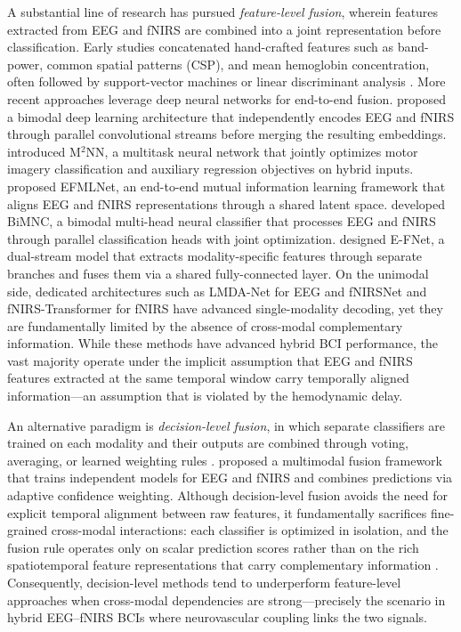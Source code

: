 \documentclass[preprint,12pt,authoryear]{elsarticle}
\begin{document}
A substantial line of research has pursued \textit{feature-level fusion}, wherein features extracted from EEG and fNIRS are combined into a joint representation before classification. Early studies concatenated hand-crafted features such as band-power, common spatial patterns (CSP), and mean hemoglobin concentration, often followed by support-vector machines or linear discriminant analysis \citep{gao2023hybrid, ali2023correlation}. More recent approaches leverage deep neural networks for end-to-end fusion. \citet{cooney2021bimodal} proposed a bimodal deep learning architecture that independently encodes EEG and fNIRS through parallel convolutional streams before merging the resulting embeddings. \citet{he2022multimodal_mtnn} introduced M$^2$NN, a multitask neural network that jointly optimizes motor imagery classification and auxiliary regression objectives on hybrid inputs. \citet{qiu2024efmlnet} proposed EFMLNet, an end-to-end mutual information learning framework that aligns EEG and fNIRS representations through a shared latent space. \citet{xu2024bimnc} developed BiMNC, a bimodal multi-head neural classifier that processes EEG and fNIRS through parallel classification heads with joint optimization. \citet{yu2025efnet} designed E-FNet, a dual-stream model that extracts modality-specific features through separate branches and fuses them via a shared fully-connected layer. On the unimodal side, dedicated architectures such as LMDA-Net \citep{miao2023lmda} for EEG and fNIRSNet \citep{wickramaratne2023fnirsnet} and fNIRS-Transformer \citep{wang2022transformer_fnirs} for fNIRS have advanced single-modality decoding, yet they are fundamentally limited by the absence of cross-modal complementary information. While these methods have advanced hybrid BCI performance, the vast majority operate under the implicit assumption that EEG and fNIRS features extracted at the same temporal window carry temporally aligned information---an assumption that is violated by the hemodynamic delay.

An alternative paradigm is \textit{decision-level fusion}, in which separate classifiers are trained on each modality and their outputs are combined through voting, averaging, or learned weighting rules \citep{jiang2019independent, rabbani2024deep}. \citet{sun2020multimodal} proposed a multimodal fusion framework that trains independent models for EEG and fNIRS and combines predictions via adaptive confidence weighting. Although decision-level fusion avoids the need for explicit temporal alignment between raw features, it fundamentally sacrifices fine-grained cross-modal interactions: each classifier is optimized in isolation, and the fusion rule operates only on scalar prediction scores rather than on the rich spatiotemporal feature representations that carry complementary information \citep{dai2023information}. Consequently, decision-level methods tend to underperform feature-level approaches when cross-modal dependencies are strong---precisely the scenario in hybrid EEG--fNIRS BCIs where neurovascular coupling links the two signals.
\end{document}
